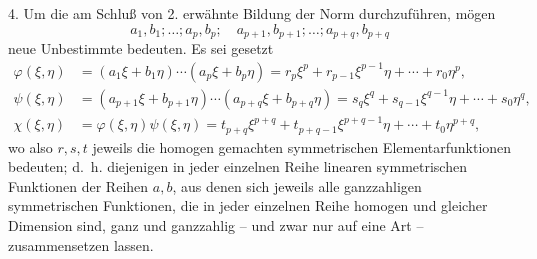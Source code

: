 \documentclass[11pt]{article}
\begin{document}
4. Um die am Schluß von 2. erwähnte Bildung der Norm durchzuführen, mögen
\[
 a_1,b_1;\ldots; a_p,b_p;\quad a_{p+1},b_{p+1};\ldots; a_{p+q},b_{p+q}
\]
neue Unbestimmte bedeuten. Es sei gesetzt
\begin{equation}
\begin{aligned}
 \varphi(\xi,\eta)&=(a_1\xi+b_1\eta)\cdots(a_p\xi+b_p\eta)
     =r_p\xi^p+r_{p-1}\xi^{p-1}\eta+\cdots+r_0\eta^p,\\
 \psi(\xi,\eta)&=(a_{p+1}\xi+b_{p+1}\eta)\cdots(a_{p+q}\xi+b_{p+q}\eta)
     =s_q\xi^q+s_{q-1}\xi^{q-1}\eta+\cdots+s_0\eta^q,\\
 \chi(\xi,\eta)&=\varphi(\xi,\eta)\psi(\xi,\eta)
     =t_{p+q}\xi^{p+q}+t_{p+q-1}\xi^{p+q-1}\eta+\cdots+t_0\eta^{p+q},
\end{aligned}
\tag{8}
\end{equation}
wo also $r,s,t$ jeweils die homogen gemachten symmetrischen Elementarfunktionen bedeuten; d.~h. diejenigen in jeder einzelnen Reihe linearen symmetrischen Funktionen der Reihen $a,b$, aus denen sich jeweils alle ganzzahligen symmetrischen Funktionen, die in jeder einzelnen Reihe homogen und gleicher Dimension sind, ganz und ganzzahlig -- und zwar nur auf eine Art -- zusammensetzen lassen.
\end{document}
